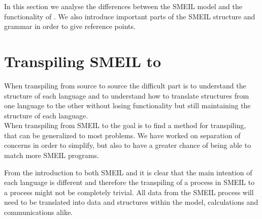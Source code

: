 


In this section we analyse the differences between the SMEIL model and the functionality of \cspm. We also introduce important parts of the SMEIL structure and grammar in order to give reference points.

\section{Transpiling SMEIL to \cspm{}} \label{sec:transpiling}
When transpiling from source to source the difficult part is to understand the structure of each language and to understand how to translate structures from one language to the other without losing functionality but still maintaining the structure of each language.\\
When transpiling from SMEIL to \cspm{} the goal is to find a method for transpiling, that can be generalized to most problems. We have worked on separation of concerns in order to simplify, but also to have a greater chance of being able to match more SMEIL programs.

From the introduction to both SMEIL and \cspm it is clear that the main intention of each language is different and therefore the transpiling of a process in SMEIL to a \cspm process might not be completely trivial. All data from the SMEIL process will need to be translated into data and structures within the \cspm model, calculations and communications alike.







